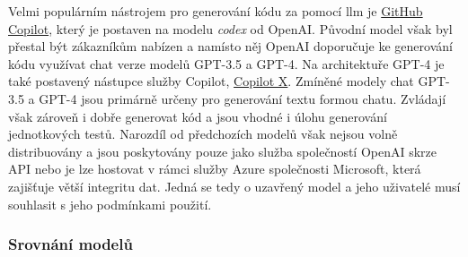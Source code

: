 \documentclass[12pt]{article}
\begin{document}
            Velmi populárním nástrojem pro generování kódu za pomocí \gls{llm} je \href{https://github.com/features/copilot}{GitHub Copilot}, který je postaven na modelu \textit{codex} od OpenAI. Původní model však byl přestal být zákazníkům nabízen a namísto něj OpenAI doporučuje ke generování kódu využívat chat verze modelů GPT-3.5 a GPT-4. Na architektuře GPT-4 je také postavený nástupce služby Copilot, \href{https://github.com/features/preview/copilot-x}{Copilot X}. Zmíněné modely chat GPT-3.5 a GPT-4 jsou primárně určeny pro generování textu formou chatu. Zvládají však zároveň i dobře generovat kód a jsou vhodné i úlohu generování jednotkových testů. Narozdíl od předchozích modelů však nejsou volně distribuovány a jsou poskytovány pouze jako služba společností OpenAI skrze API nebo je lze hostovat v rámci služby Azure společnosti Microsoft, která zajišťuje větší integritu dat. Jedná se tedy o uzavřený model a jeho uživatelé musí souhlasit s jeho podmínkami použití.


            \subsubsection{Srovnání modelů}

            \newpage
\end{document}
